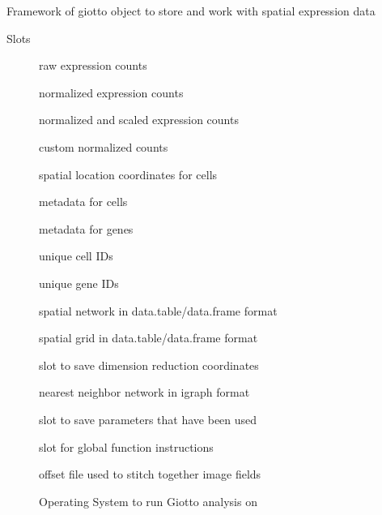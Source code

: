 \documentclass[a4paper]{book}
\begin{document}
%
\begin{Description}\relax
Framework of giotto object to store and work with spatial expression data
\end{Description}
%
\begin{Section}{Slots}

\begin{description}

\item[] raw expression counts

\item[] normalized expression counts

\item[] normalized and scaled expression counts

\item[] custom normalized counts

\item[] spatial location coordinates for cells

\item[] metadata for cells

\item[] metadata for genes

\item[] unique cell IDs

\item[] unique gene IDs

\item[] spatial network in data.table/data.frame format

\item[] spatial grid in data.table/data.frame format

\item[] slot to save dimension reduction coordinates

\item[] nearest neighbor network in igraph format

\item[] slot to save parameters that have been used

\item[] slot for global function instructions

\item[] offset file used to stitch together image fields

\item[] Operating System to run Giotto analysis on

\end{description}
\end{Section}
\end{document}
